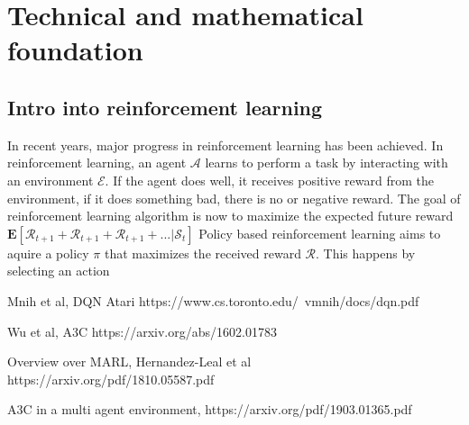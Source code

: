 %
%

\chapter{Technical and mathematical foundation}\label{chap.grundlagen}
\section{Intro into reinforcement learning}\label{projektmanagement}
In recent years, major progress in reinforcement learning has been achieved.
In reinforcement learning, an agent $\mathcal{A}$ learns to perform a task by interacting with an environment $\mathcal{E}$.
If the agent does well, it receives positive reward from the environment, if it does something bad, there is no or negative reward. The goal of reinforcement learning algorithm is now to maximize the expected future reward $\mathbf{E}[\mathcal{R}_{t+1}+\mathcal{R}_{t+1}+\mathcal{R}_{t+1}+...|\mathcal{S}_{t}]$
Policy based reinforcement learning aims to aquire a policy $\pi$ that maximizes the received reward $\mathcal{R}$. This happens by selecting an action 



Mnih et al, DQN Atari
https://www.cs.toronto.edu/~vmnih/docs/dqn.pdf

Wu et al, A3C
https://arxiv.org/abs/1602.01783

Overview over MARL, Hernandez-Leal et al
https://arxiv.org/pdf/1810.05587.pdf

A3C in a multi agent environment, 
https://arxiv.org/pdf/1903.01365.pdf

